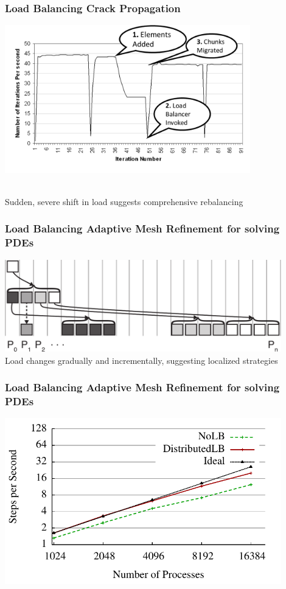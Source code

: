 \begin{frame}[fragile]
\frametitle{Load Balancing Crack Propagation}
\begin{centering}
\includegraphics[width=0.8\textwidth]{../figures/LButilizationCrackPropWithAnnotation}
\end{centering}\\
Sudden, severe shift in load suggests comprehensive rebalancing
\end{frame}


\begin{frame}
\frametitle{Load Balancing Adaptive Mesh Refinement for solving PDEs}
\includegraphics[width=0.9\textwidth]{../figures/amr_mapping.pdf}\\
Load changes gradually and incrementally, suggesting localized strategies
\end{frame}


\begin{frame}
\frametitle{Load Balancing Adaptive Mesh Refinement for solving PDEs}
\includegraphics[width=0.9\textwidth]{../figures/amr_scaling_distlb.pdf}
\end{frame}


